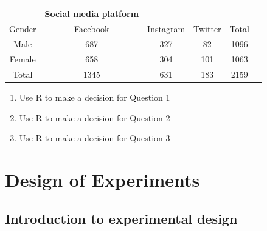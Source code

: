 \documentclass[]{book}
\begin{document}
\begin{longtable}[]{@{}cccccc@{}}
\toprule
& Social media platform & & & &\tabularnewline
\midrule
\endhead
Gender & Facebook & Instagram & Twitter & Total &\tabularnewline
Male & 687 & 327 & 82 & 1096 &\tabularnewline
Female & 658 & 304 & 101 & 1063 &\tabularnewline
Total & 1345 & 631 & 183 & 2159 &\tabularnewline
\bottomrule
\end{longtable}

\begin{enumerate}
\def\labelenumi{\arabic{enumi}.}
\setcounter{enumi}{3}
\item
  Use R to make a decision for Question 1
\item
  Use R to make a decision for Question 2
\item
  Use R to make a decision for Question 3
\end{enumerate}

\hypertarget{design-of-experiments}{%
\chapter{Design of Experiments}\label{design-of-experiments}}


\hypertarget{introduction-to-experimental-design}{%
\section{Introduction to experimental design}\label{introduction-to-experimental-design}}
\end{document}
